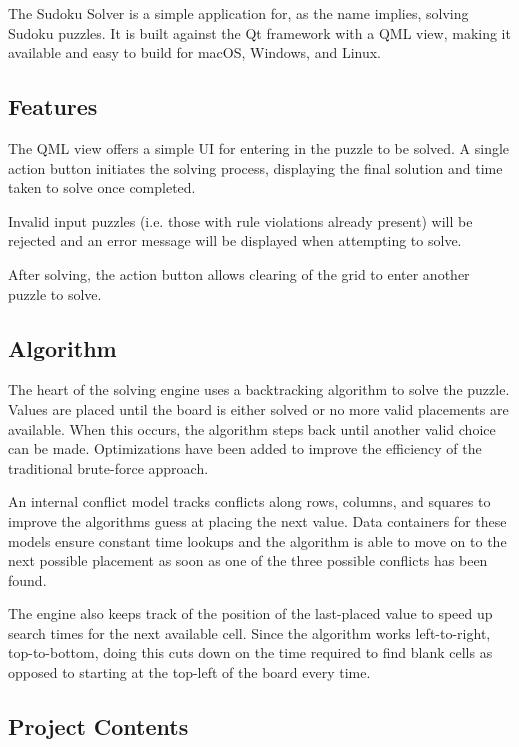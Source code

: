 The Sudoku Solver is a simple application for, as the name implies, solving Sudoku puzzles. It is built against the Qt framework with a Q\+ML view, making it available and easy to build for mac\+OS, Windows, and Linux.

\subsection*{Features}

The Q\+ML view offers a simple UI for entering in the puzzle to be solved. A single action button initiates the solving process, displaying the final solution and time taken to solve once completed.

Invalid input puzzles (i.\+e. those with rule violations already present) will be rejected and an error message will be displayed when attempting to solve.

After solving, the action button allows clearing of the grid to enter another puzzle to solve.

\subsection*{Algorithm}

The heart of the solving engine uses a backtracking algorithm to solve the puzzle. Values are placed until the board is either solved or no more valid placements are available. When this occurs, the algorithm steps back until another valid choice can be made. Optimizations have been added to improve the efficiency of the traditional brute-\/force approach.

An internal conflict model tracks conflicts along rows, columns, and squares to improve the algorithm\textquotesingle{}s guess at placing the next value. Data containers for these models ensure constant time lookups and the algorithm is able to move on to the next possible placement as soon as one of the three possible conflicts has been found.

The engine also keeps track of the position of the last-\/placed value to speed up search times for the next available cell. Since the algorithm works left-\/to-\/right, top-\/to-\/bottom, doing this cuts down on the time required to find blank cells as opposed to starting at the top-\/left of the board every time.

\subsection*{Project Contents}

